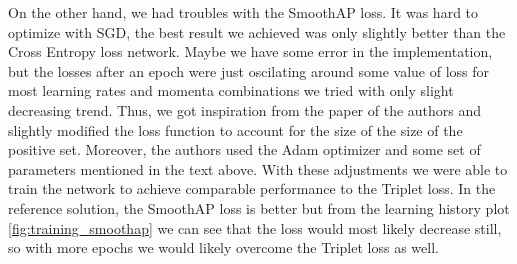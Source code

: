 \documentclass[a4paper,11pt]{article}
\begin{document}
On the other hand, we had troubles with the SmoothAP loss.
It was hard to optimize with SGD, the best result we achieved was only slightly better than the Cross Entropy loss network.
Maybe we have some error in the implementation, but the losses after an epoch were just oscilating around some value of loss for most learning rates and momenta combinations we tried with only slight decreasing trend.
Thus, we got inspiration from the paper of the authors and slightly modified the loss function to account for the size of the size of the positive set.
Moreover, the authors used the Adam optimizer and some set of parameters mentioned in the text above.
With these adjustments we were able to train the network to achieve comparable performance to the Triplet loss.
In the reference solution, the SmoothAP loss is better but from the learning history plot \ref{fig:training_smoothap} we can see that the loss would most likely decrease still, so with more epochs we would likely overcome the Triplet loss as well.
\end{document}
